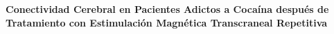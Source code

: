 \begin{center}
    \large\textbf{Conectividad Cerebral en Pacientes Adictos a Cocaína después de
     Tratamiento con Estimulación Magnética Transcraneal Repetitiva}
\end{center}
\begin{quotation}
    \noindent
    \blindtext
\end{quotation}
\clearpage
